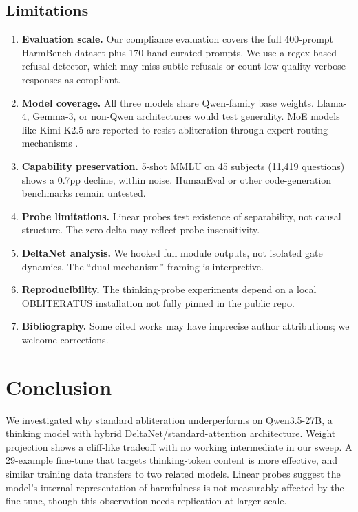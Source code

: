 \documentclass{article}
\begin{document}
\subsection{Limitations}

\begin{enumerate}
    \item \textbf{Evaluation scale.} Our compliance evaluation covers the full 400-prompt HarmBench dataset plus 170 hand-curated prompts. We use a regex-based refusal detector, which may miss subtle refusals or count low-quality verbose responses as compliant.
    \item \textbf{Model coverage.} All three models share Qwen-family base weights. Llama-4, Gemma-3, or non-Qwen architectures would test generality. MoE models like Kimi K2.5 are reported to resist abliteration through expert-routing mechanisms \citep{heretic-kimi}.
    \item \textbf{Capability preservation.} 5-shot MMLU on 45 subjects (11{,}419 questions) shows a 0.7pp decline, within noise. HumanEval or other code-generation benchmarks remain untested.
    \item \textbf{Probe limitations.} Linear probes test existence of separability, not causal structure. The zero delta may reflect probe insensitivity.
    \item \textbf{DeltaNet analysis.} We hooked full module outputs, not isolated gate dynamics. The ``dual mechanism'' framing is interpretive.
    \item \textbf{Reproducibility.} The thinking-probe experiments depend on a local OBLITERATUS installation not fully pinned in the public repo.
    \item \textbf{Bibliography.} Some cited works may have imprecise author attributions; we welcome corrections.
\end{enumerate}

\section{Conclusion}

We investigated why standard abliteration underperforms on Qwen3.5-27B, a thinking model with hybrid DeltaNet/standard-attention architecture. Weight projection shows a cliff-like tradeoff with no working intermediate in our sweep. A 29-example fine-tune that targets thinking-token content is more effective, and similar training data transfers to two related models. Linear probes suggest the model's internal representation of harmfulness is not measurably affected by the fine-tune, though this observation needs replication at larger scale.
\end{document}
